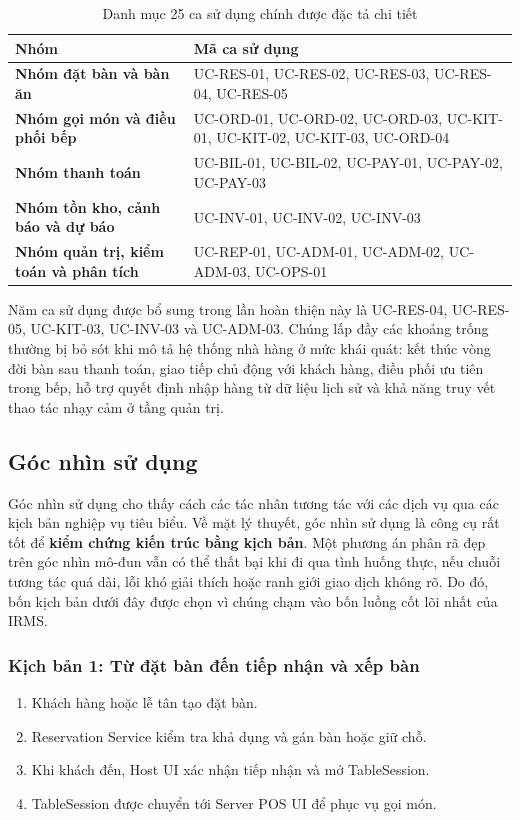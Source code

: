 \documentclass[11pt,a4paper]{article}
\begin{document}
\begin{table}[H]
\centering
\caption{Danh mục 25 ca sử dụng chính được đặc tả chi tiết}
\begin{tabularx}{\textwidth}{>{\bfseries}p{4.0cm} X}
\toprule
Nhóm & Mã ca sử dụng \\
\midrule
Nhóm đặt bàn và bàn ăn & UC-RES-01, UC-RES-02, UC-RES-03, UC-RES-04, UC-RES-05 \\
Nhóm gọi món và điều phối bếp & UC-ORD-01, UC-ORD-02, UC-ORD-03, UC-KIT-01, UC-KIT-02, UC-KIT-03, UC-ORD-04 \\
Nhóm thanh toán & UC-BIL-01, UC-BIL-02, UC-PAY-01, UC-PAY-02, UC-PAY-03 \\
Nhóm tồn kho, cảnh báo và dự báo & UC-INV-01, UC-INV-02, UC-INV-03 \\
Nhóm quản trị, kiểm toán và phân tích & UC-REP-01, UC-ADM-01, UC-ADM-02, UC-ADM-03, UC-OPS-01 \\
\bottomrule
\end{tabularx}
\end{table}

Năm ca sử dụng được bổ sung trong lần hoàn thiện này là \textsf{UC-RES-04}, \textsf{UC-RES-05}, \textsf{UC-KIT-03}, \textsf{UC-INV-03} và \textsf{UC-ADM-03}. Chúng lấp đầy các khoảng trống thường bị bỏ sót khi mô tả hệ thống nhà hàng ở mức khái quát: kết thúc vòng đời bàn sau thanh toán, giao tiếp chủ động với khách hàng, điều phối ưu tiên trong bếp, hỗ trợ quyết định nhập hàng từ dữ liệu lịch sử và khả năng truy vết thao tác nhạy cảm ở tầng quản trị.

\subsection{Góc nhìn sử dụng}
Góc nhìn sử dụng cho thấy cách các tác nhân tương tác với các dịch vụ qua các kịch bản nghiệp vụ tiêu biểu.
Về mặt lý thuyết, góc nhìn sử dụng là công cụ rất tốt để \textbf{kiểm chứng kiến trúc bằng kịch bản}.
Một phương án phân rã đẹp trên góc nhìn mô-đun vẫn có thể thất bại khi đi qua tình huống thực,
nếu chuỗi tương tác quá dài, lỗi khó giải thích hoặc ranh giới giao dịch không rõ.
Do đó, bốn kịch bản dưới đây được chọn vì chúng chạm vào bốn luồng cốt lõi nhất của IRMS.

\subsubsection{Kịch bản 1: Từ đặt bàn đến tiếp nhận và xếp bàn}
\begin{enumerate}
  \item Khách hàng hoặc lễ tân tạo đặt bàn.
  \item \textsf{Reservation Service} kiểm tra khả dụng và gán bàn hoặc giữ chỗ.
  \item Khi khách đến, \textsf{Host UI} xác nhận tiếp nhận và mở \textsf{TableSession}.
  \item \textsf{TableSession} được chuyển tới \textsf{Server POS UI} để phục vụ gọi món.
\end{enumerate}
\end{document}
